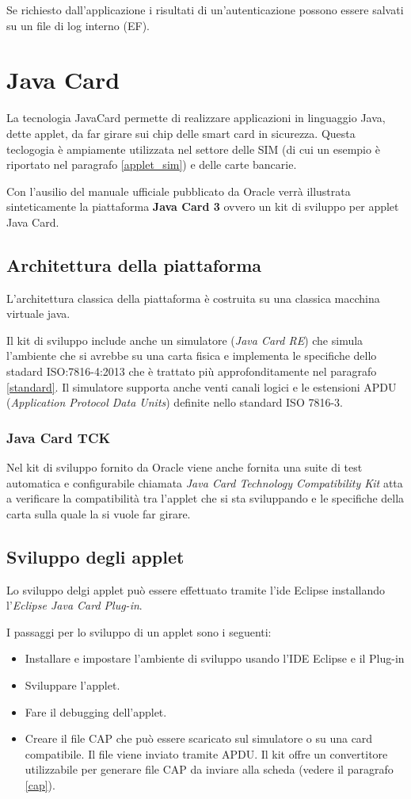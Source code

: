 Se richiesto dall'applicazione i risultati di un'autenticazione possono essere salvati su un file di log interno (EF).
\cite{isoiec3}

\section{Java Card}
\label{java_card}
La tecnologia JavaCard permette di realizzare applicazioni in linguaggio Java, dette applet, da far girare sui chip delle smart card in sicurezza. Questa teclogogia è ampiamente utilizzata nel settore delle SIM (di cui un esempio è riportato nel paragrafo \ref{applet_sim}) e delle carte bancarie.
\cite{Wiki_java}

Con l'ausilio del manuale ufficiale pubblicato da Oracle \cite{javacard3platform} verrà illustrata sinteticamente la piattaforma \textbf{Java Card 3} ovvero un kit di sviluppo per applet Java Card.
\subsection{Architettura della piattaforma}
L'architettura classica della piattaforma è costruita su una classica macchina virtuale java.

Il kit di sviluppo include anche un simulatore (\textit{Java Card RE}) che simula l'ambiente che si avrebbe su una carta fisica e implementa le specifiche dello stadard ISO:7816-4:2013 che è trattato più approfonditamente nel paragrafo \ref{standard}. Il simulatore supporta anche venti canali logici e le estensioni APDU (\textit{Application Protocol Data Units}) definite nello standard ISO 7816-3.
\subsubsection{Java Card TCK}
Nel kit di sviluppo fornito da Oracle viene anche fornita una suite di test automatica e configurabile chiamata \textit{Java Card Technology Compatibility Kit} atta a verificare la compatibilità tra l'applet che si sta sviluppando e le specifiche della carta sulla quale la si vuole far girare.

\subsection{Sviluppo degli applet}
Lo sviluppo delgi applet può essere effettuato tramite l'ide Eclipse installando l'\textit{Eclipse Java Card Plug-in}.

I passaggi per lo sviluppo di un applet sono i seguenti:
\begin{itemize}
    \item Installare e impostare l'ambiente di sviluppo usando l'IDE Eclipse e il Plug-in
    \item Sviluppare l'applet.
    \item Fare il debugging dell'applet.
    \item Creare il file CAP che può essere scaricato sul simulatore o su una card compatibile. Il file viene inviato tramite APDU. Il kit offre un convertitore utilizzabile per generare file CAP da inviare alla scheda (vedere il paragrafo \ref{cap}).
\end{itemize}

